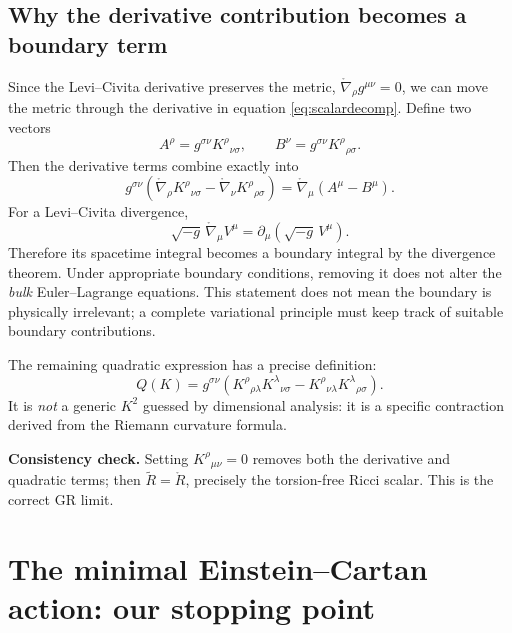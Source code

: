 \documentclass[11pt,a4paper]{article}
\newcommand{\LC}{\mathring{\nabla}}
\newcommand{\RR}{\mathring{R}}
\begin{document}
\subsection{Why the derivative contribution becomes a boundary term}
Since the Levi--Civita derivative preserves the metric, $\LC_\rho g^{\mu\nu}=0$, we can move the metric through the derivative in equation \eqref{eq:scalardecomp}. Define two vectors
\begin{equation}
A^\rho=g^{\sigma\nu}K^\rho{}_{\nu\sigma},\qquad
B^\nu=g^{\sigma\nu}K^\rho{}_{\rho\sigma}.
\end{equation}
Then the derivative terms combine exactly into
\begin{equation}\label{eq:div}
g^{\sigma\nu}\left(\LC_\rho K^\rho{}_{\nu\sigma}-\LC_\nu K^\rho{}_{\rho\sigma}\right)
=\LC_\mu(A^\mu-B^\mu).
\end{equation}
For a Levi--Civita divergence,
\begin{equation}\label{eq:dividentity}
\boxed{\sqrt{-g}\,\LC_\mu V^\mu=\partial_\mu(\sqrt{-g}\,V^\mu).}
\end{equation}
Therefore its spacetime integral becomes a boundary integral by the divergence theorem. Under appropriate boundary conditions, removing it does not alter the \emph{bulk} Euler--Lagrange equations. This statement does not mean the boundary is physically irrelevant; a complete variational principle must keep track of suitable boundary contributions.

The remaining quadratic expression has a precise definition:
\begin{equation}\label{eq:QK}
\boxed{Q(K)=g^{\sigma\nu}\left(K^\rho{}_{\rho\lambda}K^\lambda{}_{\nu\sigma}
-K^\rho{}_{\nu\lambda}K^\lambda{}_{\rho\sigma}\right).}
\end{equation}
It is \emph{not} a generic $K^2$ guessed by dimensional analysis: it is a specific contraction derived from the Riemann curvature formula.

\begin{whybox}\textbf{Consistency check.} Setting $K^\rho{}_{\mu\nu}=0$ removes both the derivative and quadratic terms; then $\widetilde R=\RR$, precisely the torsion-free Ricci scalar. This is the correct GR limit.\end{whybox}

\section{The minimal Einstein--Cartan action: our stopping point}
\end{document}
